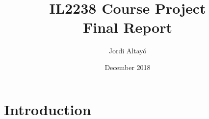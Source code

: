 \documentclass{article}
\title{IL2238 Course Project\\[1em]Final Report}
\author{Jordi Altayó}
\date{December 2018}
\begin{document}
\maketitle

\section{Introduction}
\end{document}
